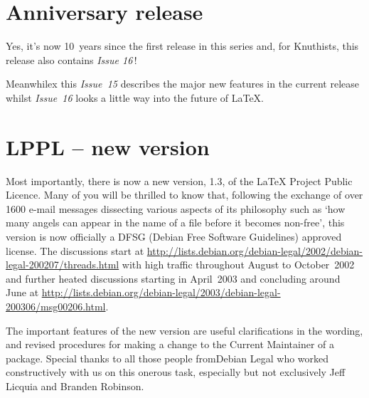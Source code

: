 \documentclass{ltnews}
\begin{document}
\maketitle


\section{Anniversary release}

Yes, it's now 10~years since the first release in this series and, for
Knuthists, this release also contains \textit{Issue 16}\,!

Meanwhilex this \textit{Issue~15} describes the major new features in
the current release whilst \textit{Issue~16} looks\newline
a little way into the future of \LaTeX{}.


\section{LPPL -- new version}

Most importantly, there is now a new version, 1.3, of the \LaTeX{}
Project Public Licence.   Many of you will\newline
be thrilled to know that, following the exchange of over 1600 e-mail
messages dissecting various aspects of its philosophy such as `how
many angels can appear in the name of a file before it becomes
non-free', this version\newline
is now officially a DFSG (Debian Free Software Guidelines) approved license.
The discussions start at
\url{http://lists.debian.org/debian-legal/2002/debian-legal-200207/threads.html}
with high traffic throughout August to October~2002 and further
heated discussions starting in April~2003 and concluding
around June at
\url{http://lists.debian.org/debian-legal/2003/debian-legal-200306/msg00206.html}.

The important features of the new version are useful clarifications in
the wording, and revised procedures\newline
for making a change to the Current Maintainer of a package.  Special
thanks to all those people from\newline Debian Legal who worked
constructively with us\newline
on this onerous task, especially but not exclusively\newline
Jeff Licquia and Branden Robinson.
\end{document}
